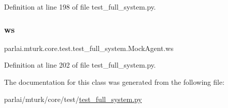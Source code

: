 Definition at line 198 of file test\+\_\+full\+\_\+system.\+py.

\mbox{\label{classparlai_1_1mturk_1_1core_1_1test_1_1test__full__system_1_1MockAgent_a2870f5b01b6d901d44d2dae99ff6a263}} 
\subsubsection{\texorpdfstring{ws}{ws}}
{\footnotesize\ttfamily parlai.\+mturk.\+core.\+test.\+test\+\_\+full\+\_\+system.\+Mock\+Agent.\+ws}



Definition at line 202 of file test\+\_\+full\+\_\+system.\+py.



The documentation for this class was generated from the following file\+:\begin{DoxyCompactItemize}
\item 
parlai/mturk/core/test/\hyperlink{test_2test__full__system_8py}{test\+\_\+full\+\_\+system.\+py}\end{DoxyCompactItemize}
